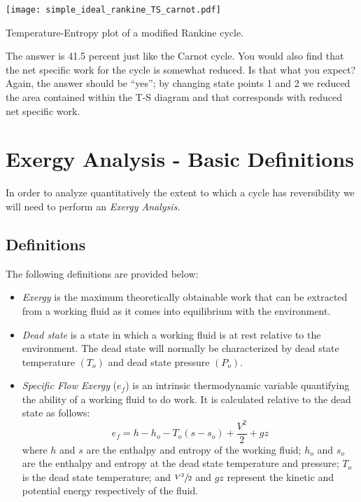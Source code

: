 \begin{marginfigure}
\texttt{[image: simple\_ideal\_rankine\_TS\_carnot.pdf]}
\caption{Temperature-Entropy plot of a modified Rankine cycle.}
\label{fig:simple_rankine_TS_carnot}
\end{marginfigure} 

The answer is 41.5 percent just like the Carnot cycle.  You would also find that the net specific work for the cycle is somewhat reduced.  Is that what you expect?  Again, the answer should be ``yes''; by changing state points 1 and 2 we reduced the area contained within the T-S diagram and that corresponds with reduced net specific work.

\section{Exergy Analysis - Basic Definitions}
In order to analyze quantitatively the extent to which a cycle has reversibility we will need to perform an \emph{Exergy Analysis}.

\subsection{Definitions}
The following definitions are provided below:
\begin{itemize}
\item \emph{Exergy} is the maximum theoretically obtainable work that can be extracted from a working fluid as it comes into equilibrium with the environment.

\item \emph{Dead state} is a state in which a working fluid is at rest relative to the environment.  The dead state will normally be characterized by dead state temperature $(T_o)$ and dead state pressure $(P_o)$.

\item \emph{Specific Flow Exergy} ($e_f$) is an intrinsic thermodynamic variable quantifying the ability of a working fluid to do work.  It is calculated relative to the dead state as follows:
$$e_f = h - h_o - T_o(s - s_o) + \frac{V^2}{2} + gz$$
where $h$ and $s$ are the enthalpy and entropy of the working fluid; $h_o$ and $s_o$ are the enthalpy and entropy at the dead state temperature and pressure; $T_o$ is the dead state temperature; and $\sfrac{V^2}{2}$ and $gz$ represent the kinetic and potential energy respectively of the fluid.

\end{itemize}

